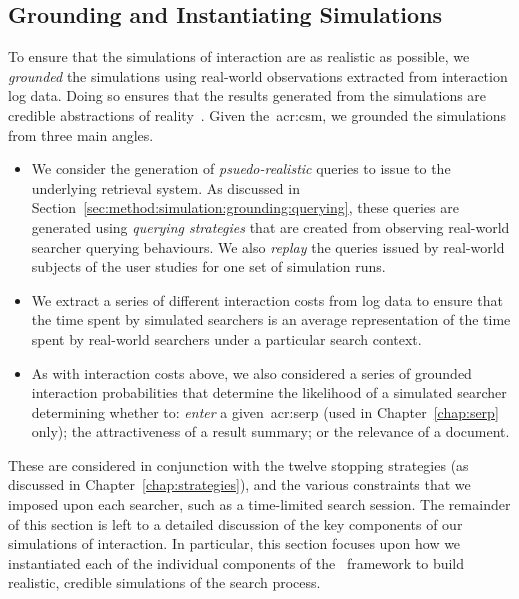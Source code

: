 \subsection{Grounding and Instantiating Simulations}\label{sec:method:simulation:grounding}
To ensure that the simulations of interaction are as realistic as possible, we \emph{grounded} the simulations using real-world observations extracted from interaction log data. Doing so ensures that the results generated from the simulations are credible abstractions of reality~\citep{azzopardi2010workshop}. Given the~\gls{acr:csm}, we grounded the simulations from three main angles.

\begin{itemize}
    \item{ We consider the generation of \emph{psuedo-realistic} queries to issue to the underlying retrieval system. As discussed in Section~\ref{sec:method:simulation:grounding:querying}, these queries are generated using \emph{querying strategies} that are created from observing real-world searcher querying behaviours. We also \emph{replay} the queries issued by real-world subjects of the user studies for one set of simulation runs.}
    \item{ We extract a series of different interaction costs from log data to ensure that the time spent by simulated searchers is an average representation of the time spent by real-world searchers under a particular search context.}
    \item{ As with interaction costs above, we also considered a series of grounded interaction probabilities that determine the likelihood of a simulated searcher determining whether to: \emph{enter} a given~\gls{acr:serp} (used in Chapter~\ref{chap:serp} only); the attractiveness of a result summary; or the relevance of a document.}
\end{itemize}

These are considered in conjunction with the twelve stopping strategies (as discussed in Chapter~\ref{chap:strategies}), and the various constraints that we imposed upon each searcher, such as a time-limited search session. The remainder of this section is left to a detailed discussion of the key components of our simulations of interaction. In particular, this section focuses upon how we instantiated each of the individual components of the \simiir~framework to build realistic, credible simulations of the search process.

